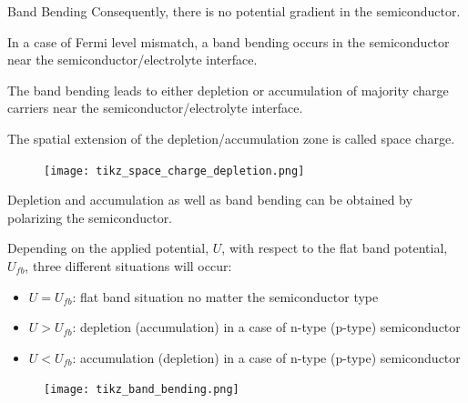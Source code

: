 \documentclass[10pt,compress,handout]{beamer}
\begin{document}
\begin{frame}[allowframebreaks=1.0]{Band Bending}
        Consequently, there is no potential gradient in the semiconductor. 
        
        In a case of Fermi level mismatch, a band bending occurs in the semiconductor 
        near the semiconductor/electrolyte interface.  
        
        \framebreak
        The band bending leads to either depletion or accumulation of majority 
        charge carriers near the semiconductor/electrolyte interface. 
        
        The spatial extension of the depletion/accumulation zone is called space 
        charge.
    
        \begin{figure}[H]
            \centering
            \texttt{[image: tikz\_space\_charge\_depletion.png]}
            \label{fig_space_charge_depletion}
        \end{figure}

        \framebreak
        
        Depletion and accumulation as well as band bending can be obtained 
        by polarizing the semiconductor.
        
        Depending on the applied potential, $U$, with respect to the flat band 
        potential, $U_{fb}$, three different situations will occur:
        \begin{itemize}
            \item $U = U_{fb}$: flat band situation no matter the semiconductor type
            \item $U > U_{fb}$: depletion (accumulation) in a case of n-type (p-type) semiconductor  
            \item $U < U_{fb}$: accumulation (depletion) in a case of n-type (p-type) semiconductor
        \end{itemize}
        
        \begin{figure}[H]
        \centering
            \texttt{[image: tikz\_band\_bending.png]}
            \label{fig_band_bending}
        \end{figure}
    

\end{frame}
\end{document}
